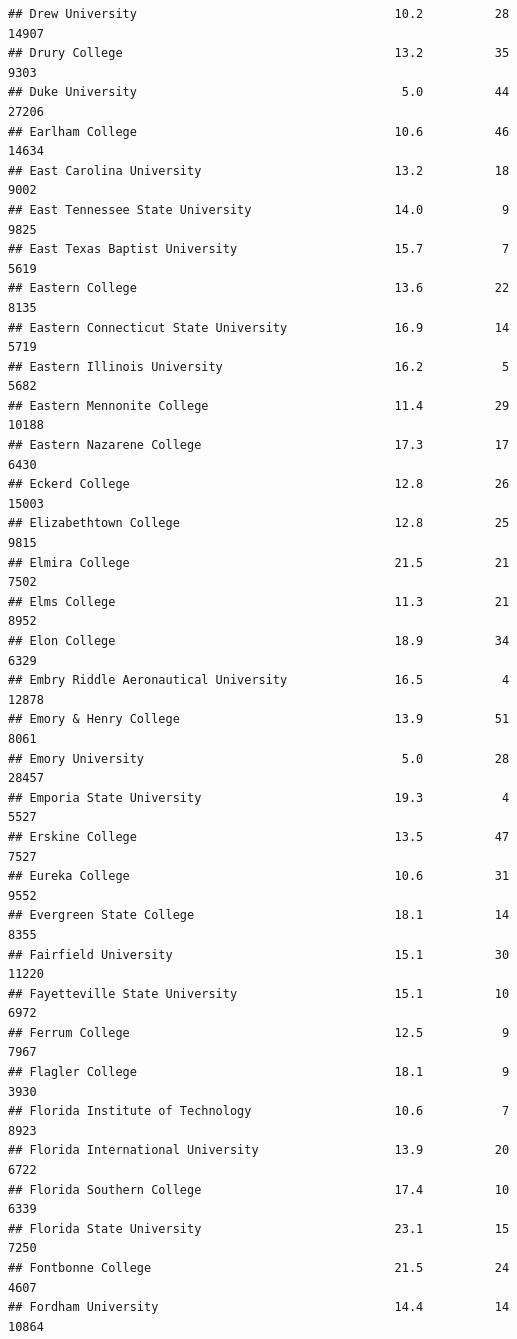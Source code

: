 \documentclass[
]{article}
\begin{document}
\begin{verbatim}
## Drew University                                    10.2          28  14907
## Drury College                                      13.2          35   9303
## Duke University                                     5.0          44  27206
## Earlham College                                    10.6          46  14634
## East Carolina University                           13.2          18   9002
## East Tennessee State University                    14.0           9   9825
## East Texas Baptist University                      15.7           7   5619
## Eastern College                                    13.6          22   8135
## Eastern Connecticut State University               16.9          14   5719
## Eastern Illinois University                        16.2           5   5682
## Eastern Mennonite College                          11.4          29  10188
## Eastern Nazarene College                           17.3          17   6430
## Eckerd College                                     12.8          26  15003
## Elizabethtown College                              12.8          25   9815
## Elmira College                                     21.5          21   7502
## Elms College                                       11.3          21   8952
## Elon College                                       18.9          34   6329
## Embry Riddle Aeronautical University               16.5           4  12878
## Emory & Henry College                              13.9          51   8061
## Emory University                                    5.0          28  28457
## Emporia State University                           19.3           4   5527
## Erskine College                                    13.5          47   7527
## Eureka College                                     10.6          31   9552
## Evergreen State College                            18.1          14   8355
## Fairfield University                               15.1          30  11220
## Fayetteville State University                      15.1          10   6972
## Ferrum College                                     12.5           9   7967
## Flagler College                                    18.1           9   3930
## Florida Institute of Technology                    10.6           7   8923
## Florida International University                   13.9          20   6722
## Florida Southern College                           17.4          10   6339
## Florida State University                           23.1          15   7250
## Fontbonne College                                  21.5          24   4607
## Fordham University                                 14.4          14  10864

\end{verbatim}
\end{document}
